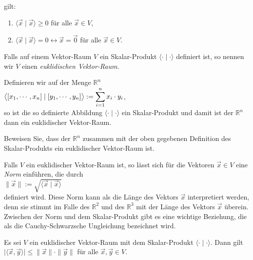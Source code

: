 \begin{Definition}
\begin{enumerate}
        gilt:
        \begin{enumerate}
        \item $\langle \vec{x}\mid \vec{x} \rangle \geq 0$ \quad f\"{u}r alle $\vec{x} \in V$,
        \item $\langle \vec{x}\mid \vec{x} \rangle = 0 \leftrightarrow \vec{x} = \vec{0}$ \quad f\"{u}r alle $\vec{x} \in V$.
        \end{enumerate}
  \end{enumerate} 
  Falls auf einem Vektor-Raum $V$ ein Skalar-Produkt $\langle \cdot \mid \cdot \rangle$ definiert
  ist, so nennen wir $V$ einen \emph{\color{blue}euklidischen Vektor-Raum}.  \eoxs
\end{Definition}

\example
Definieren wir auf der Menge $\mathbb{R}^n$ 
\\[0.2cm]
\hspace*{1.3cm}
$\displaystyle\bigl\langle [x_1, \cdots, x_n] \mid [y_1, \cdots, y_n] \bigr\rangle := \sum\limits_{i=1}^n x_i \cdot y_i$,
\\[0.2cm]
so ist die so definierte Abbildung $\langle \cdot \mid \cdot \rangle$ ein Skalar-Produkt und damit
ist der $\mathbb{R}^n$ dann ein euklidischer Vektor-Raum.  \eox

\exercise
Beweisen Sie, dass der $\mathbb{R}^n$ zusammen mit der oben gegebenen Definition des Skalar-Produkts
ein euklidischer Vektor-Raum ist.  \eox


Falls $V$ ein euklidischer Vektor-Raum ist, so l\"{a}sst sich f\"{u}r die Vektoren $\vec{x} \in V$ eine \emph{\color{blue}Norm}
einf\"{u}hren, die durch
\\[0.2cm]
\hspace*{1.3cm}
$\|\vec{x}\| := \sqrt{\langle \vec{x} \mid \vec{x} \rangle}$
\\[0.2cm]
definiert wird.  Diese Norm kann als die L\"{a}nge des Vektors $\vec{x}$ interpretiert werden, denn sie
stimmt im Falle des $\mathbb{R}^2$ und des $\mathbb{R}^3$ mit der L\"{a}nge des Vektors $\vec{x}$
\"{u}berein.  Zwischen der Norm und dem Skalar-Produkt gibt es eine wichtige Beziehung, die als die
Cauchy-Schwarzsche Ungleichung bezeichnet wird.

\begin{Satz} \lb
  Es sei $V$ ein euklidischer Vektor-Raum mit dem Skalar-Produkt $\langle \cdot \mid \cdot \rangle$.
  Dann gilt
  \\[0.2cm]
  \hspace*{1.3cm}
  $\bigl|\langle \vec{x}, \vec{y} \rangle\bigr| \leq \| \vec{x} \| \cdot \|\vec{y}\|$ 
  \quad f\"{u}r alle $\vec{x}, \vec{y} \in V$.
\end{Satz}


